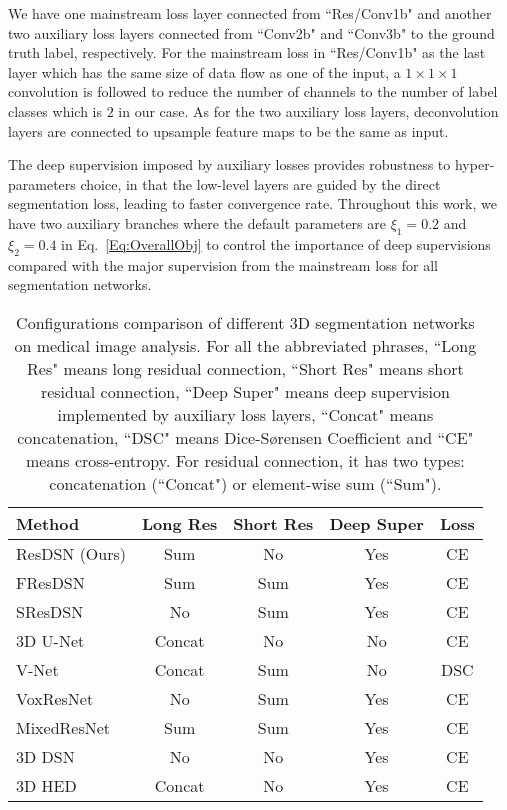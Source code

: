 \documentclass[10pt,twocolumn,letterpaper]{article}
\begin{document}
We have one mainstream loss layer connected from ``Res/Conv1b" and another two auxiliary loss layers connected from ``Conv2b" and ``Conv3b" to the ground truth label, respectively. For the mainstream loss in ``Res/Conv1b" as the last layer which has the same size of data flow as one of the input, a $1 \times 1 \times 1$ convolution is followed to reduce the number of channels to the number of label classes which is $2$ in our case. As for the two auxiliary loss layers, deconvolution layers are connected to upsample feature maps to be the same as input.

The deep supervision imposed by auxiliary losses provides robustness to hyper-parameters choice, in that the low-level layers are guided by the direct segmentation loss, leading to faster convergence rate. Throughout this work, we have two auxiliary branches where the default parameters are $\xi_1 = 0.2$ and $\xi_2 = 0.4$ in Eq.~\ref{Eq:OverallObj} to control the importance of deep supervisions compared with the major supervision from the mainstream loss for all segmentation networks.

\begin{table}[htb]
\footnotesize
\begin{center}
\begin{tabular}{lcccc}\toprule
Method 							& Long Res 	& Short Res & Deep Super & Loss\\
\hline
ResDSN (Ours) 							& Sum		& No		& Yes 		&CE \\
\hline
FResDSN 						& Sum		& Sum		& Yes 		&CE \\
SResDSN 						& No		& Sum		& Yes 		&CE \\
\hline
3D U-Net~\cite{cciccek20163d}	& Concat	& No		& No		&CE\\
V-Net~\cite{milletari2016v} 	& Concat	& Sum		& No		&DSC\\
VoxResNet~\cite{chen2017voxresnet}	& No 	& Sum		& Yes		&CE\\
MixedResNet~\cite{yu2017volumetric}	& Sum	& Sum 		& Yes		&CE\\
3D DSN~\cite{dou20173d} 		& No		& No		& Yes 		&CE \\
3D HED~\cite{merkow2016dense} 	& Concat	& No		& Yes 		&CE \\
\bottomrule
\end{tabular}
\end{center}
\caption{
    Configurations comparison of different 3D segmentation networks on medical image analysis.
    For all the abbreviated phrases, ``Long Res" means long residual connection, ``Short Res" means short residual connection, ``Deep Super" means deep supervision implemented by auxiliary loss layers, ``Concat" means concatenation, ``DSC" means Dice-S{\o}rensen Coefficient and ``CE" means cross-entropy. For residual connection, it has two types: concatenation (``Concat") or element-wise sum (``Sum").
}
\label{Tab:Config3DSegmentation}
\end{table}
\end{document}
